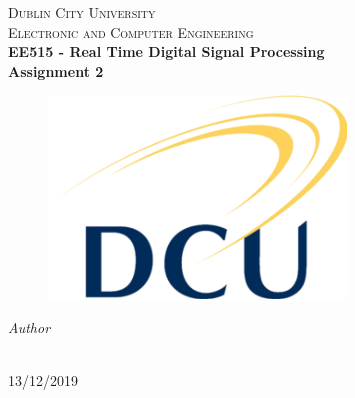 \begin{titlepage}
  \begin{center}

    \textsc{\LARGE Dublin City University}\\[1cm]
    \textsc{\Large Electronic and Computer Engineering}\\[0.5cm]

    {\LARGE \bfseries EE515 - Real Time Digital Signal Processing\\[0.4cm]}
    {\Large \bfseries Assignment 2\\[0.4cm]}

    \begin{figure}[H]
	\includegraphics{images/Dcu-logo.png}
	\centering
    \end{figure}

    \vskip 2cm
    \emph{Author}\\[0.1cm]
    \noindent{}\\[0.1cm]

    \vfill

    {\large{13/12/2019}}

  \end{center}
\end{titlepage}
